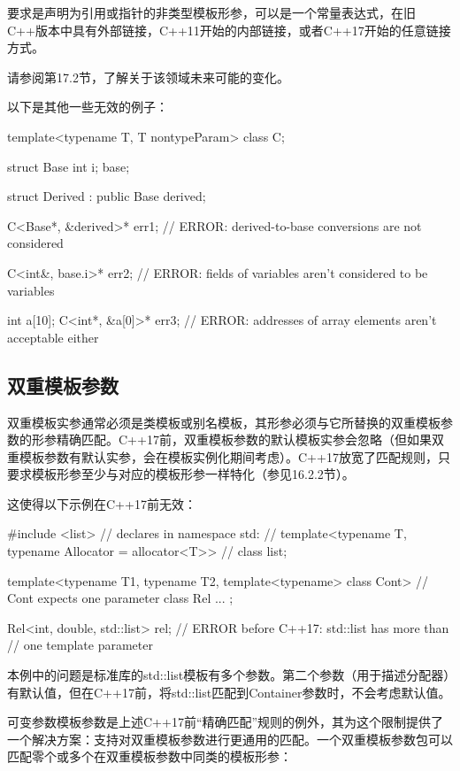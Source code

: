 要求是声明为引用或指针的非类型模板形参，可以是一个常量表达式，在旧C++版本中具有外部链接，C++11开始的内部链接，或者C++17开始的任意链接方式。

请参阅第17.2节，了解关于该领域未来可能的变化。

以下是其他一些无效的例子：

\begin{cpp}
template<typename T, T nontypeParam>
class C;

struct Base {
	int i;
} base;

struct Derived : public Base {} derived;

C<Base*, &derived>* err1; // ERROR: derived-to-base conversions are not considered

C<int&, base.i>* err2; // ERROR: fields of variables aren't considered to be variables

int a[10];
C<int*, &a[0]>* err3; // ERROR: addresses of array elements aren't acceptable either
\end{cpp}


\subsection{双重模板参数}

双重模板实参通常必须是类模板或别名模板，其形参必须与它所替换的双重模板参数的形参精确匹配。C++17前，双重模板参数的默认模板实参会忽略（但如果双重模板参数有默认实参，会在模板实例化期间考虑）。C++17放宽了匹配规则，只要求模板形参至少与对应的模板形参一样特化（参见16.2.2节）。

这使得以下示例在C++17前无效：

\begin{cpp}
#include <list>
	// declares in namespace std:
	// template<typename T, typename Allocator = allocator<T>>
	// class list;

template<typename T1, typename T2,
		template<typename> class Cont> // Cont expects one parameter
class Rel {
	...
};

Rel<int, double, std::list> rel; // ERROR before C++17: std::list has more than
								// one template parameter
\end{cpp}

本例中的问题是标准库的std::list模板有多个参数。第二个参数（用于描述分配器）有默认值，但在C++17前，将std::list匹配到Container参数时，不会考虑默认值。

可变参数模板参数是上述C++17前“精确匹配”规则的例外，其为这个限制提供了一个解决方案：支持对双重模板参数进行更通用的匹配。一个双重模板参数包可以匹配零个或多个在双重模板参数中同类的模板形参：

